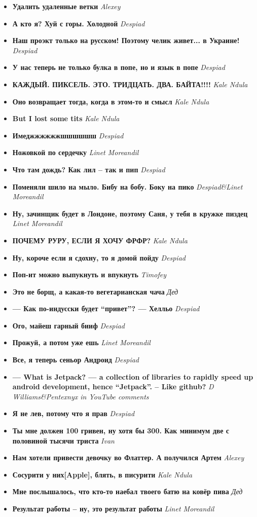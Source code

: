 \documentclass[12pt,a4paper]{article}
\newcommand{\entry}[2] {\textbf{#1} \textemdash \emph{#2}}
\newcommand{\kn}{Kale Ndula}
\newcommand{\lm}{Linet Moreandil}
\newcommand{\dd}{Despiad}
\newcommand{\al}{Alexey}
\begin{document}
\begin{itemize}
\item \entry{Удалить удаленные ветки}{\al}
\item \entry{А кто я? Хуй с горы. Холодной}{\dd}
\item \entry{Наш проэкт только на русском! Поэтому челик живет... в Украине!}{\dd}
\item \entry{У нас теперь не только булка в попе, но и язык в попе}{\dd}
\item \entry{КАЖДЫЙ. ПИКСЕЛЬ. ЭТО. ТРИДЦАТЬ. ДВА. БАЙТА!!!!}{\kn}
\item \entry{Оно возвращает тогда, когда в этом-то и смысл}{\kn}
\item \entry{But I lost some tits}{\kn}
\item \entry{Имеджжжжжжшшшшшш}{\dd}
\item \entry{Ножовкой по сердечку}{\lm}
\item \entry{Что там дождь? Как лил -- так и пип}{\dd}
\item \entry{Поменяли шило на мыло. Бибу на бобу. Боку на пико}{\dd\&\lm}
\item \entry{Ну, зачинщик будет в Лондоне, поэтому Саня, у тебя в кружке пиздец}{\lm}
\item \entry{ПОЧЕМУ РУРУ, ЕСЛИ Я ХОЧУ ФРФР?}{\kn}
\item \entry{Ну, короче если я сдохну, то я домой пойду}{\dd}
\item \entry{Поп-ит можно выпукнуть и впукнуть}{Timofey}
\item \entry{Это не борщ, а какая-то вегетарианская чача}{Дед}
\item \entry{--- Как по-индусски будет ``привет''? --- Хелльо}{\dd}
\item \entry{Ого, майеш гарный бииф}{\dd}
\item \entry{Прожуй, а потом уже ешь}{\lm}
\item \entry{Все, я теперь сеньор Андроид}{\dd}
\item \entry{--- What is Jetpack? --- a collection of libraries to rapidly speed up android development, hence ``Jetpack''. -- Like github?}{D Williams\&Pentexnyx in YouTube comments}
\item \entry{Я не лев, потому что я прав}{\dd}
\item \entry{Ты мне должен 100 гривен, ну хотя бы 300. Как минимум две с половиной тысячи триста}{Ivan}
\item \entry{Нам хотели привести девочку во Флаттер. А получился Артем}{\al}
\item \entry{Сосурити у них[Apple], блять, в писурити}{\kn}
\item \entry{Мне послышалось, что кто-то наебал твоего батю на ковёр пива}{Дед}
\item \entry{Результат работы -- ну, это результат работы}{\lm}

\end{itemize}
\end{document}
